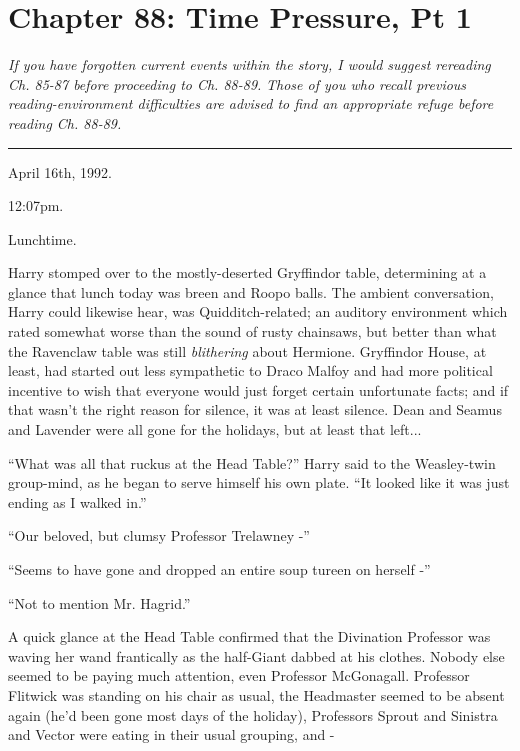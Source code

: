 \chapter{Chapter 88: Time Pressure, Pt 1}
\emph{If you have forgotten current events within the story, I would
suggest rereading Ch. 85-87 before proceeding to Ch. 88-89.} \emph{Those
of you who recall previous reading-environment difficulties are advised
to find an appropriate refuge before reading Ch. 88-89.}

\begin{center}\rule{3in}{0.4pt}\end{center}

April 16th, 1992.

12:07pm.

Lunchtime.

Harry stomped over to the mostly-deserted Gryffindor table, determining
at a glance that lunch today was breen and Roopo balls. The ambient
conversation, Harry could likewise hear, was Quidditch-related; an
auditory environment which rated somewhat worse than the sound of rusty
chainsaws, but better than what the Ravenclaw table was still
\emph{blithering} about Hermione. Gryffindor House, at least, had
started out less sympathetic to Draco Malfoy and had more political
incentive to wish that everyone would just forget certain unfortunate
facts; and if that wasn't the right reason for silence, it was at least
silence. Dean and Seamus and Lavender were all gone for the holidays,
but at least that left...

``What was all that ruckus at the Head Table?'' Harry said to the
Weasley-twin group-mind, as he began to serve himself his own plate.
``It looked like it was just ending as I walked in.''

``Our beloved, but clumsy Professor Trelawney -''

``Seems to have gone and dropped an entire soup tureen on herself -''

``Not to mention Mr. Hagrid.''

A quick glance at the Head Table confirmed that the Divination Professor
was waving her wand frantically as the half-Giant dabbed at his clothes.
Nobody else seemed to be paying much attention, even Professor
McGonagall. Professor Flitwick was standing on his chair as usual, the
Headmaster seemed to be absent again (he'd been gone most days of the
holiday), Professors Sprout and Sinistra and Vector were eating in their
usual grouping, and -

